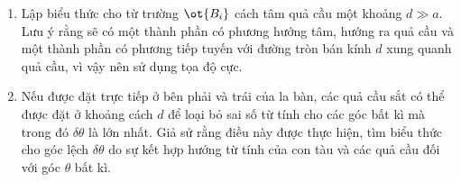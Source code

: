 \begin{vd}
\begin{enumerate}[1)]
\begin{center}
\begin{tikzpicture}[x=0.75pt,y=0.75pt,yscale=-1,xscale=1]
\end{tikzpicture}

    \end{center}
    \item Lập biểu thức cho từ trường $\ot{B_i}$ cách tâm quả cầu một khoảng $d\gg a$. Lưu ý rằng sẽ có một thành phần có phương hướng tâm, hướng ra quả cầu và một thành phần có phương tiếp tuyến với đường tròn bán kính $d$ xung quanh quả cầu, vì vậy nên sử dụng tọa độ cực.
    \item Nếu được đặt trực tiếp ở bên phải và trái của la bàn, các quả cầu sắt có thể được đặt ở khoảng cách $d$ để loại bỏ sai số từ tính cho các góc bất kì mà trong đó $\delta \theta$ là lớn nhất. Giả sử rằng điều này được thực hiện, tìm biểu thức cho góc lệch $\delta\theta$ do sự kết hợp hướng từ tính của con tàu và các quả cầu đối với góc $\theta$ bất kì.
\end{enumerate}

\end{vd}
